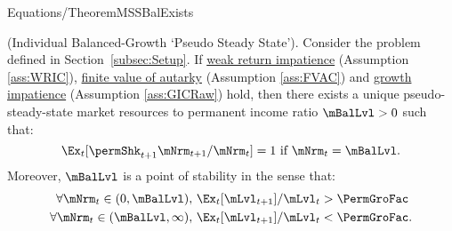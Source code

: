 \documentclass[BufferStockTheory]{subfiles}
\begin{document}
\begin{verbatimwrite}{Equations/TheoremMSSBalExists}
  \begin{theorem}(Individual Balanced-Growth `Pseudo Steady State').
    Consider the problem defined in Section~\ref{subsec:Setup}.
If \hyperlink{WRIC}{weak return impatience} (Assumption \ref{ass:WRIC}), \hyperlink{FVAC}{finite value of autarky} (Assumption \ref{ass:FVAC}) and \hyperlink{GIC}{growth impatience} (Assumption \ref{ass:GICRaw}) hold, then there exists a unique pseudo-steady-state market resources to permanent income ratio $\mBalLvl>0$ such that:
    \begin{equation}
      \Ex_t [\permShk_{t+1}{\mNrm}_{t+1}/\mNrm_t] = 1 \mbox{~if~} \mNrm_t = \mBalLvl.
      \label{eq:mBalLvl}
    \end{equation}
    Moreover, $\mBalLvl$ is a point of stability in the sense that:
    \begin{equation}
      \label{eq:stabilityStE}
      \begin{split}
        \forall {\mNrm}_t\in(0,\mBalLvl),      \,\,& \Ex_{t}[\mLvl_{t+1}]/\mLvl_{t} > \PermGroFac \\
        \forall {\mNrm}_t\in(\mBalLvl,\infty), \,\,& \Ex_{t}[\mLvl_{t+1}]/\mLvl_{t} < \PermGroFac.
      \end{split}
    \end{equation}
  \end{theorem}
\end{verbatimwrite}

\end{document}
